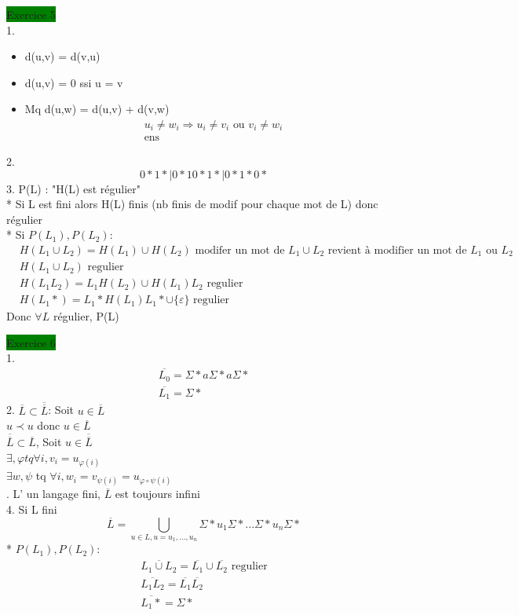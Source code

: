 \documentclass{article}
\begin{document}
\noindent \colorbox{green}{Exercice 5}\\
1. \begin{itemize}
    \item d(u,v) = d(v,u)\\
    \item d(u,v) = 0 ssi u = v\\
    \item Mq d(u,w) = d(u,v) + d(v,w)\\
    \begin{align*}
        u_i \neq w_i \Rightarrow u_i \neq v_i \text{ ou } v_i \neq w_i\\
        \text{ens }
    \end{align*}
\end{itemize}
2. \begin{equation*}
    0*1*|0*10*1*|0*1*0*
\end{equation*}
3. P(L) : "H(L) est régulier"\\
* Si L est fini alors H(L) finis (nb finis de modif pour chaque mot de L) donc régulier\\
* Si \(P(L_1), P(L_2)\): \begin{align*}
    &H(L_1 \cup L_2) = H(L_1) \cup H(L_2) \text{ modifer un mot de \(L_1\cup L_2\) revient à modifier un mot de \(L_1\) ou \(L_2\)}\\
    &H(L_1\cup L_2) \text{ regulier}\\
    &H(L_1L_2) = L_1H(L_2) \cup H(L_1)L_2 \text{ regulier}\\
    &H(L_1*) = L_1*H(L_1)L_1* \cup \{\varepsilon\} \text{ regulier}
\end{align*}
Donc \(\forall L\) régulier, P(L)

\noindent \colorbox{green}{Exercice 6}\\
1. \begin{eqnarray*}
    \overline{L_0} = \Sigma* a \Sigma* a\Sigma*\\
    \overline{L_1} = \Sigma*
\end{eqnarray*}
2. \(\overline{L} \subset \overline{\overline{L}}\): Soit \(u \in \overline{L}\)\\
\(u \prec u \) donc \(u \in \overline{L}\)\\
\(\overline{\overline{L}} \subset \overline{L}\), Soit \(u \in \overline{\overline{L}}\)\\
\(\exists, \varphi tq \forall i, v_i = u_{\varphi(i)}\)\\
\(\exists w, \psi\) tq \(\forall i, w_i = v_{\psi(i)} = u_{\varphi \circ \psi (i)}\)\\
. L' un langage fini, \(\overline{L}\) est toujours infini\\
4. Si L fini \begin{equation*}
    \overline{L} = \bigcup_{u\in L, u = u_1,...,u_n} \Sigma*u_1\Sigma*...\Sigma*u_n\Sigma*
\end{equation*}
* \(P(L_1), P(L_2)\):
\begin{align*}
    \overline{L_1 \cup L_2} = \overline{L_1} \cup \overline{L_2} \text{ regulier}\\
    \overline{L_1 L_2} = \overline{L_1}\overline{L_2}\\
    \overline{L_1*} = \Sigma *
\end{align*}
\end{document}
